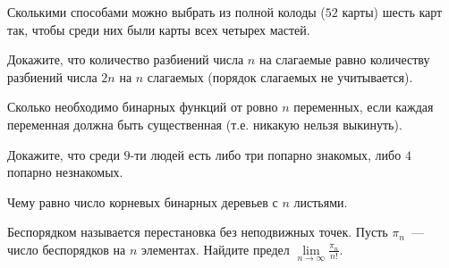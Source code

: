 \setcounter{curtask}{1}

\mytitle{}

\begin{task}
    Сколькими способами можно выбрать из полной колоды ($52$ карты) шесть карт так,
    чтобы среди них были карты всех четырех мастей.
\end{task}

\begin{task}
    Докажите, что количество разбиений числа $n$ на слагаемые равно количеству
    разбиений числа $2n$ на $n$ слагаемых (порядок слагаемых не учитывается).
\end{task}

\begin{task}
    Сколько необходимо бинарных функций от ровно $n$ переменных, если каждая
    переменная должна быть существенная (т.е. никакую нельзя выкинуть).
\end{task}

\begin{task}
    Докажите, что среди $9$-ти людей есть либо три попарно знакомых, либо $4$ попарно
    незнакомых.
\end{task}

\begin{task}
    Чему равно число корневых бинарных деревьев с $n$ листьями.
\end{task}

\begin{task}
    Беспорядком называется перестановка без неподвижных точек. Пусть $\pi_n$~---
    число беспорядков на $n$ элементах. Найдите предел $\lim\limits_{n \to \infty}
    \frac{\pi_n}{n!}$.
\end{task}